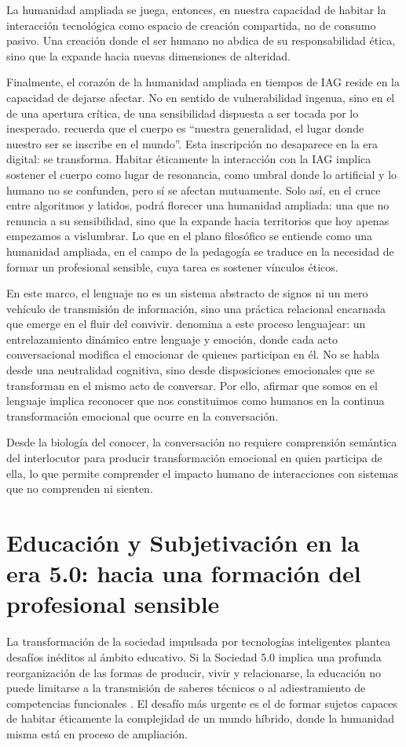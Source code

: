 \documentclass[spanish]{textolivre}
\begin{document}
La humanidad ampliada se juega, entonces, en nuestra capacidad de habitar la interacción tecnológica como espacio de creación compartida, no de consumo pasivo. Una creación donde el ser humano no abdica de su responsabilidad ética, sino que la expande hacia nuevas dimensiones de alteridad.

Finalmente, el corazón de la humanidad ampliada en tiempos de IAG reside en la capacidad de dejarse afectar. No en sentido de vulnerabilidad ingenua, sino en el de una apertura crítica, de una sensibilidad dispuesta a ser tocada por lo inesperado. \textcite[p. 94]{merleauponty2009} recuerda que el cuerpo es “nuestra generalidad, el lugar donde nuestro ser se inscribe en el mundo”. Esta inscripción no desaparece en la era digital: se transforma. Habitar éticamente la interacción con la IAG implica sostener el cuerpo como lugar de resonancia, como umbral donde lo artificial y lo humano no se confunden, pero sí se afectan mutuamente. Solo así, en el cruce entre algoritmos y latidos, podrá florecer una humanidad ampliada: una que no renuncia a su sensibilidad, sino que la expande hacia territorios que hoy apenas empezamos a vislumbrar. Lo que en el plano filosófico se entiende como una humanidad ampliada, en el campo de la pedagogía se traduce en la necesidad de formar un profesional sensible, cuya tarea es sostener vínculos éticos.

En este marco, el lenguaje no es un sistema abstracto de signos ni un mero vehículo de transmisión de información, sino una práctica relacional encarnada que emerge en el fluir del convivir. \textcite{maturana1997} denomina a este proceso lenguajear: un entrelazamiento dinámico entre lenguaje y emoción, donde cada acto conversacional modifica el emocionar de quienes participan en él. No se habla desde una neutralidad cognitiva, sino desde disposiciones emocionales que se transforman en el mismo acto de conversar. Por ello, afirmar que somos en el lenguaje implica reconocer que nos constituimos como humanos en la continua transformación emocional que ocurre en la conversación.

Desde la biología del conocer, la conversación no requiere comprensión semántica del interlocutor para producir transformación emocional en quien participa de ella, lo que permite comprender el impacto humano de interacciones con sistemas que no comprenden ni sienten.


\section{Educación y Subjetivación en la era 5.0: hacia una formación del profesional sensible}\label{sec-formato}
La transformación de la sociedad impulsada por tecnologías inteligentes plantea desafíos inéditos al ámbito educativo. Si la Sociedad 5.0 implica una profunda reorganización de las formas de producir, vivir y relacionarse, la educación no puede limitarse a la transmisión de saberes técnicos o al adiestramiento de competencias funcionales \cite{seguel2023}. El desafío más urgente es el de formar sujetos capaces de habitar éticamente la complejidad de un mundo híbrido, donde la humanidad misma está en proceso de ampliación.
\end{document}
